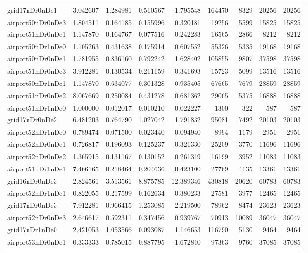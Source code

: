 \begin{longtable}{|l|r|r|r|r|r|r|r|r|}
grid17nDr0nDe1 & 3.042607 & 1.284981 & 0.510567 & 1.795548 & 164470 & 8329 & 20256 & 20256 \\
airport50nDr0nDe3 & 1.804511 & 0.164185 & 0.155996 & 0.320181 & 19256 & 5599 & 15825 & 15825 \\
airport51nDr0nDe1 & 1.147870 & 0.164767 & 0.077516 & 0.242283 & 16565 & 2866 & 8212 & 8212 \\
airport50nDr1nDe0 & 1.105263 & 0.431638 & 0.175914 & 0.607552 & 55326 & 5335 & 19168 & 19168 \\
airport50nDr0nDe1 & 1.781955 & 0.836160 & 0.792242 & 1.628402 & 105855 & 9807 & 37598 & 37598 \\
airport51nDr0nDe3 & 3.912281 & 0.130534 & 0.211159 & 0.341693 & 15723 & 5099 & 13516 & 13516 \\
airport50nDr1nDe1 & 1.147870 & 0.634077 & 0.301328 & 0.935405 & 67665 & 7679 & 28859 & 28859 \\
airport51nDr0nDe2 & 8.067669 & 0.250084 & 0.431278 & 0.681362 & 29065 & 5375 & 16888 & 16888 \\
airport51nDr1nDe0 & 1.000000 & 0.012017 & 0.010210 & 0.022227 & 1300 & 322 & 587 & 587 \\
grid17nDr0nDe2 & 6.481203 & 0.764790 & 1.027042 & 1.791832 & 95081 & 7492 & 20103 & 20103 \\
airport52nDr1nDe0 & 0.789474 & 0.071500 & 0.023440 & 0.094940 & 8994 & 1179 & 2951 & 2951 \\
airport52nDr0nDe1 & 0.726817 & 0.196093 & 0.125237 & 0.321330 & 25209 & 3770 & 11696 & 11696 \\
airport52nDr0nDe2 & 1.365915 & 0.131167 & 0.130152 & 0.261319 & 16199 & 3952 & 11083 & 11083 \\
airport51nDr1nDe1 & 7.466165 & 0.218464 & 0.204636 & 0.423100 & 27769 & 4135 & 13361 & 13361 \\
grid16nDr0nDe3 & 2.824561 & 3.513561 & 8.875785 & 12.389346 & 430818 & 20620 & 60783 & 60783 \\
airport52nDr1nDe1 & 0.822055 & 0.217599 & 0.162634 & 0.380233 & 27581 & 3977 & 12465 & 12465 \\
grid17nDr0nDe3 & 7.912281 & 0.966415 & 1.253085 & 2.219500 & 78962 & 8474 & 23623 & 23623 \\
airport52nDr0nDe3 & 2.646617 & 0.592311 & 0.347456 & 0.939767 & 70913 & 10089 & 36047 & 36047 \\
grid17nDr1nDe0 & 2.421053 & 1.053566 & 0.093087 & 1.146653 & 116790 & 5130 & 9464 & 9464 \\
airport53nDr0nDe1 & 0.333333 & 0.785015 & 0.887795 & 1.672810 & 97363 & 9760 & 37085 & 37085 \\

\end{longtable}
